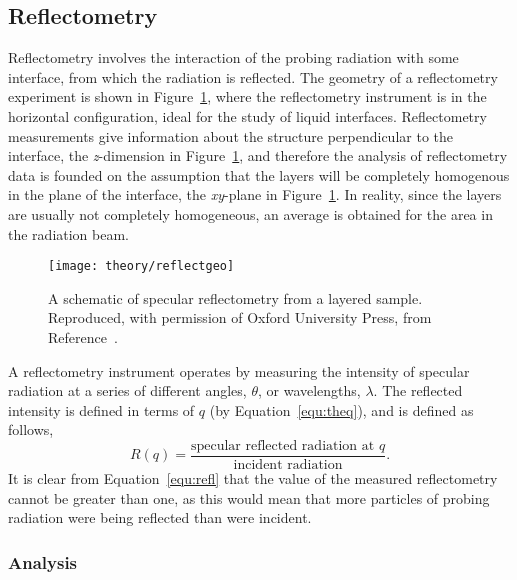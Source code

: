 \subsection{Reflectometry}
\label{sec:refltheory}

Reflectometry involves the interaction of the probing radiation with some interface, from which the radiation is reflected.
The geometry of a reflectometry experiment is shown in Figure~\ref{fig:refgeo}, where the reflectometry instrument is in the horizontal configuration, ideal for the study of liquid interfaces.
Reflectometry measurements give information about the structure perpendicular to the interface, the \emph{z}-dimension in Figure~\ref{fig:refgeo}, and therefore the analysis of reflectometry data is founded on the assumption that the layers will be completely homogenous in the plane of the interface, the \emph{xy}-plane in Figure~\ref{fig:refgeo}.
In reality, since the layers are usually not completely homogeneous, an average is obtained for the area in the radiation beam.
%
\begin{figure}
    \centering
    \texttt{[image: theory/reflectgeo]}
    \caption{A schematic of specular reflectometry from a layered sample. Reproduced, with permission of Oxford University Press\textsuperscript{\textcopyright}, from Reference~\cite{sivia_elementary_2011}.}
    \label{fig:refgeo}
\end{figure}
%
A reflectometry instrument operates by measuring the intensity of specular radiation at a series of different angles, $\theta$, or wavelengths, $\lambda$.
The reflected intensity is defined in terms of $q$ (by Equation~\ref{equ:theq}), and is defined as follows,
%
\begin{equation}
    R(q) = \frac{\text{specular reflected radiation at }q}{\text{incident radiation}}.
    \label{equ:refl}
\end{equation}
%
It is clear from Equation~\ref{equ:refl} that the value of the measured reflectometry cannot be greater than one, as this would mean that more particles of probing radiation were being reflected than were incident.

\subsubsection{Analysis}

